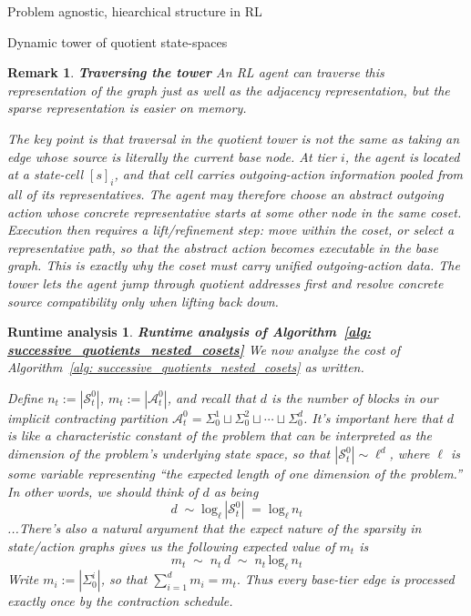 \documentclass[11pt]{article}
\newtheorem{remark}[subsubsection]{Remark}
\newtheorem{run_analysis}[subsubsection]{Runtime analysis}
\begin{document}
\begin{section}{Problem agnostic, hiearchical structure in RL}
\begin{subsection}{Dynamic tower of quotient state-spaces}
\begin{remark}
{\bf Traversing the tower}
\normalfont
An RL agent can traverse this representation of the graph just as well as the adjacency representation, but the sparse representation is easier on memory.

The key point is that traversal in the quotient tower is not the same as taking an edge whose source is literally the current base node. At tier $i$, the agent is located at a state-cell $[s]_i$, and that cell carries outgoing-action information pooled from all of its representatives. The agent may therefore choose an abstract outgoing action whose concrete representative starts at some other node in the same coset. Execution then requires a lift/refinement step: move within the coset, or select a representative path, so that the abstract action becomes executable in the base graph. This is exactly why the coset must carry unified outgoing-action data. The tower lets the agent jump through quotient addresses first and resolve concrete source compatibility only when lifting back down.
\end{remark}

\begin{run_analysis}
{\bf Runtime analysis of Algorithm~\ref{alg: successive_quotients_nested_cosets}}
\normalfont
We now analyze the cost of Algorithm~\ref{alg: successive_quotients_nested_cosets} as written.

Define
$
n_t:=|\mathcal{S}_t^0|$,
$
m_t:=|\mathcal{A}_t^0|$, and recall that $d$ is the number of blocks in our implicit contracting partition
$\mathcal{A}_t^0
=
\Sigma_0^1 \sqcup \Sigma_0^2 \sqcup \cdots \sqcup \Sigma_0^d
$.
It's important here that $d$ is like a characteristic constant of the problem that can be interpreted as the dimension of the problem's underlying state space, so that $|\mathcal{S}_t^0|\sim \ell^{d}$, where $\ell$ is some variable representing ``the expected length of one dimension of the problem.'' In other words, we should think of $d$ as being
\begin{equation}\label{eq: approx log}
d\;\sim\;\text{log}_{\ell}\,|\mathcal{S}_t^0|\;=\;\text{log}_{\ell}\,n_{t}
\end{equation}
...There's also a natural argument that the expect nature of the sparsity in state/action graphs gives us the following expected value of $m_{t}$ is
$$
m_{t}
\;\sim\;
n_{t}\,d
\;\sim\;
n_{t}\,\text{log}_{\ell}\,n_{t}
$$
Write
$
m_i:=|\Sigma_0^i|$, so that $\sum_{i=1}^d m_i=m_t.
$
Thus every base-tier edge is processed exactly once by the contraction schedule.


\end{run_analysis}
\end{subsection}
\end{section}
\end{document}
